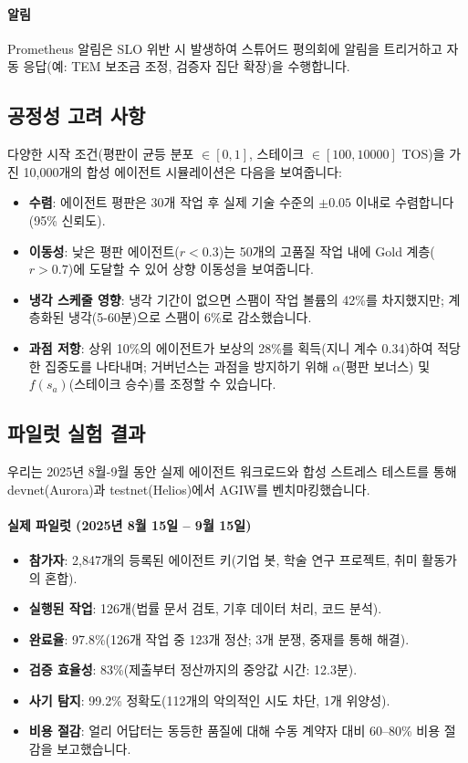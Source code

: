 \documentclass[11pt]{article}
\begin{document}
\paragraph{알림} Prometheus 알림은 SLO 위반 시 발생하여 스튜어드 평의회에 알림을 트리거하고 자동 응답(예: TEM 보조금 조정, 검증자 집단 확장)을 수행합니다.

\subsection{공정성 고려 사항}
다양한 시작 조건(평판이 균등 분포 $\in [0,1]$, 스테이크 $\in [100, 10000]$ TOS)을 가진 10,000개의 합성 에이전트 시뮬레이션은 다음을 보여줍니다:
\begin{itemize}[noitemsep]
  \item \textbf{수렴}: 에이전트 평판은 30개 작업 후 실제 기술 수준의 $\pm0.05$ 이내로 수렴합니다(95\% 신뢰도).
  \item \textbf{이동성}: 낮은 평판 에이전트($r<0.3$)는 50개의 고품질 작업 내에 Gold 계층($r>0.7$)에 도달할 수 있어 상향 이동성을 보여줍니다.
  \item \textbf{냉각 스케줄 영향}: 냉각 기간이 없으면 스팸이 작업 볼륨의 42\%를 차지했지만; 계층화된 냉각(5-60분)으로 스팸이 6\%로 감소했습니다.
  \item \textbf{과점 저항}: 상위 10\%의 에이전트가 보상의 28\%를 획득(지니 계수 0.34)하여 적당한 집중도를 나타내며; 거버넌스는 과점을 방지하기 위해 $\alpha$(평판 보너스) 및 $f(s_a)$(스테이크 승수)를 조정할 수 있습니다.
\end{itemize}

\subsection{파일럿 실험 결과}
\label{sec:pilot-results}
우리는 2025년 8월-9월 동안 실제 에이전트 워크로드와 합성 스트레스 테스트를 통해 devnet(Aurora)과 testnet(Helios)에서 AGIW를 벤치마킹했습니다.

\paragraph{실제 파일럿 (2025년 8월 15일 -- 9월 15일)}
\begin{itemize}[noitemsep]
  \item \textbf{참가자}: 2,847개의 등록된 에이전트 키(기업 봇, 학술 연구 프로젝트, 취미 활동가의 혼합).
  \item \textbf{실행된 작업}: 126개(법률 문서 검토, 기후 데이터 처리, 코드 분석).
  \item \textbf{완료율}: 97.8\%(126개 작업 중 123개 정산; 3개 분쟁, 중재를 통해 해결).
  \item \textbf{검증 효율성}: 83\%(제출부터 정산까지의 중앙값 시간: 12.3분).
  \item \textbf{사기 탐지}: 99.2\% 정확도(112개의 악의적인 시도 차단, 1개 위양성).
  \item \textbf{비용 절감}: 얼리 어답터는 동등한 품질에 대해 수동 계약자 대비 60--80\% 비용 절감을 보고했습니다.
\end{itemize}
\end{document}
